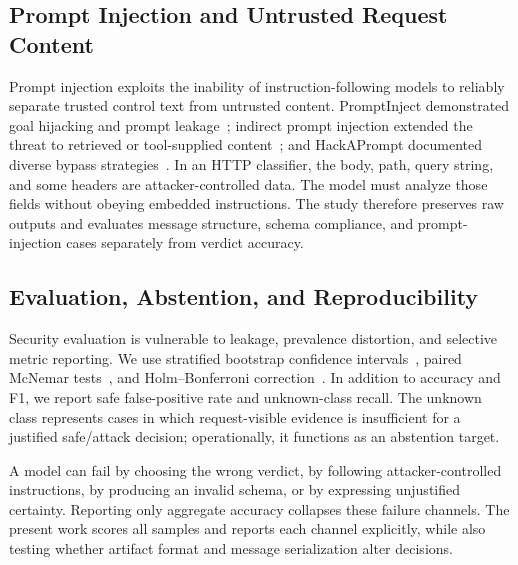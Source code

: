 \subsection{Prompt Injection and Untrusted Request Content}
Prompt injection exploits the inability of instruction-following models to reliably separate trusted control text from untrusted content. PromptInject demonstrated goal hijacking and prompt leakage~\citep{perez2022promptinject}; indirect prompt injection extended the threat to retrieved or tool-supplied content~\citep{greshake2023indirect}; and HackAPrompt documented diverse bypass strategies~\citep{schulhoff2023hackaprompt}. In an HTTP classifier, the body, path, query string, and some headers are attacker-controlled data. The model must analyze those fields without obeying embedded instructions. The study therefore preserves raw outputs and evaluates message structure, schema compliance, and prompt-injection cases separately from verdict accuracy.

\subsection{Evaluation, Abstention, and Reproducibility}
Security evaluation is vulnerable to leakage, prevalence distortion, and selective metric reporting. We use stratified bootstrap confidence intervals~\citep{efron1993bootstrap}, paired McNemar tests~\citep{mcnemar1947note}, and Holm--Bonferroni correction~\citep{holm1979sequentially}. In addition to accuracy and F1, we report safe false-positive rate and unknown-class recall. The unknown class represents cases in which request-visible evidence is insufficient for a justified safe/attack decision; operationally, it functions as an abstention target.

A model can fail by choosing the wrong verdict, by following attacker-controlled instructions, by producing an invalid schema, or by expressing unjustified certainty. Reporting only aggregate accuracy collapses these failure channels. The present work scores all samples and reports each channel explicitly, while also testing whether artifact format and message serialization alter decisions.
